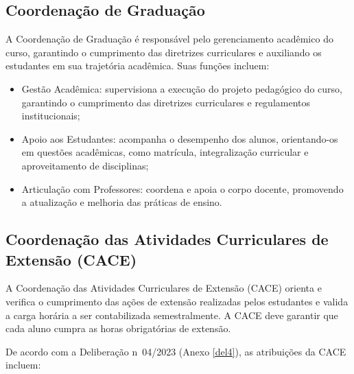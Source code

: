 \subsection{Coordenação de Graduação}

A Coordenação de Graduação é responsável pelo gerenciamento acadêmico do curso, garantindo o cumprimento das diretrizes curriculares e auxiliando os estudantes em sua trajetória acadêmica. Suas funções incluem:

\begin{itemize}
    \item Gestão Acadêmica: supervisiona a execução do projeto pedagógico do curso, garantindo o cumprimento das diretrizes curriculares e regulamentos institucionais;
    \item Apoio aos Estudantes: acompanha o desempenho dos alunos, orientando-os em questões acadêmicas, como matrícula, integralização curricular e aproveitamento de disciplinas;
    \item Articulação com Professores: coordena e apoia o corpo docente, promovendo a atualização e melhoria das práticas de ensino.

\end{itemize}

\subsection{Coordenação das Atividades Curriculares de Extensão (CACE)}

A Coordenação das Atividades Curriculares de Extensão (CACE) orienta e verifica o cumprimento das ações de extensão realizadas pelos estudantes e valida a carga horária a ser contabilizada semestralmente. A CACE deve garantir que cada aluno cumpra as horas obrigatórias de extensão.

De acordo com a Deliberação n\textordmasculine~04/2023 (Anexo \ref{del4}), as atribuições da CACE incluem:

